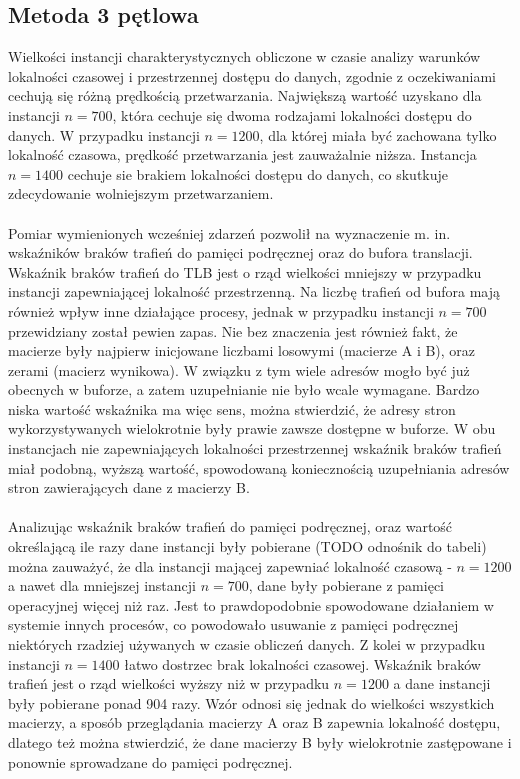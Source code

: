 \documentclass[12pt,a4paper]{article}
\begin{document}
\subsection{Metoda 3 pętlowa}

Wielkości instancji charakterystycznych obliczone w czasie analizy warunków lokalności czasowej i przestrzennej dostępu do danych, zgodnie z oczekiwaniami cechują się różną prędkością przetwarzania. Największą wartość uzyskano dla instancji $n=700$, która cechuje się dwoma rodzajami lokalności  dostępu do danych. W przypadku instancji $n=1200$, dla której miała być zachowana tylko lokalność czasowa, prędkość przetwarzania jest zauważalnie niższa. Instancja $n=1400$ cechuje sie brakiem lokalności dostępu do danych, co skutkuje zdecydowanie wolniejszym przetwarzaniem.\\
\\
Pomiar wymienionych wcześniej zdarzeń pozwolił na wyznaczenie m. in. wskaźników braków trafień do pamięci podręcznej oraz do bufora translacji. Wskaźnik braków trafień do TLB jest o rząd wielkości mniejszy w przypadku instancji zapewniającej lokalność przestrzenną. Na liczbę trafień od bufora mają również wpływ inne działające procesy, jednak w przypadku instancji $n=700$ przewidziany został pewien zapas. Nie bez znaczenia jest również fakt, że macierze były najpierw inicjowane liczbami losowymi (macierze A i B), oraz zerami (macierz wynikowa). W związku z tym wiele adresów mogło być już obecnych w buforze, a zatem uzupełnianie nie było wcale wymagane. Bardzo niska wartość wskaźnika ma więc sens, można stwierdzić, że adresy stron wykorzystywanych wielokrotnie były prawie zawsze dostępne w buforze. W obu instancjach nie zapewniających lokalności przestrzennej wskaźnik braków trafień miał podobną, wyższą wartość, spowodowaną koniecznością uzupełniania adresów stron zawierających dane z macierzy B.\\
\\
Analizując wskaźnik braków trafień do pamięci podręcznej, oraz wartość określającą ile razy dane instancji były pobierane (TODO odnośnik do tabeli) można zauważyć, że dla instancji mającej zapewniać lokalność czasową - $n=1200$ a nawet dla mniejszej instancji $n=700$, dane były pobierane z pamięci operacyjnej więcej niż raz. Jest to prawdopodobnie spowodowane działaniem w systemie innych procesów, co powodowało usuwanie z pamięci podręcznej niektórych rzadziej używanych w czasie obliczeń danych. Z kolei w przypadku instancji $n=1400$ łatwo dostrzec brak lokalności czasowej. Wskaźnik braków trafień jest o rząd wielkości wyższy niż w przypadku $n=1200$ a dane instancji były pobierane ponad 904 razy. Wzór odnosi się jednak do wielkości wszystkich macierzy, a sposób przeglądania macierzy A oraz B zapewnia lokalność dostępu, dlatego też można stwierdzić, że dane macierzy B były wielokrotnie zastępowane i ponownie sprowadzane do pamięci podręcznej.\\
\end{document}
